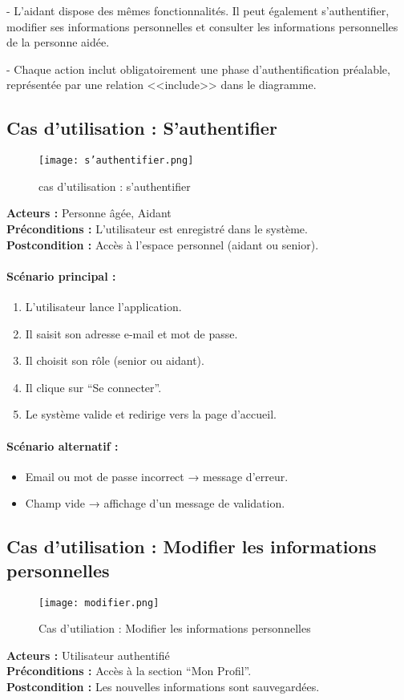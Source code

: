 \documentclass[12pt,a4paper]{report}
\begin{document}
-	L’aidant dispose des mêmes fonctionnalités. Il peut également s’authentifier, modifier ses informations personnelles et consulter les informations personnelles de la personne aidée.

-	Chaque action inclut obligatoirement une phase d’authentification préalable, représentée par une relation <<include>> dans le diagramme.

\subsection{Cas d’utilisation : S’authentifier}
\begin{figure}[H] 
    \centering
    \texttt{[image: s'authentifier.png]}
    \caption{cas d'utilisation : s'authentifier}
    \label{fig:s'authentifier}
\end{figure}
\textbf{Acteurs :} Personne âgée, Aidant \\
\textbf{Préconditions :} L’utilisateur est enregistré dans le système. \\
\textbf{Postcondition :} Accès à l’espace personnel (aidant ou senior).

\paragraph{Scénario principal :}
\begin{enumerate}
    \item L’utilisateur lance l’application.
    \item Il saisit son adresse e-mail et mot de passe.
    \item Il choisit son rôle (senior ou aidant).
    \item Il clique sur “Se connecter”.
    \item Le système valide et redirige vers la page d’accueil.
\end{enumerate}

\paragraph{Scénario alternatif :}
\begin{itemize}
    \item Email ou mot de passe incorrect → message d’erreur.
    \item Champ vide → affichage d’un message de validation.
\end{itemize}

\subsection{Cas d’utilisation : Modifier les informations personnelles}
\begin{figure}[H] 
    \centering
    \texttt{[image: modifier.png]}
    \caption{Cas d'utiliation : Modifier les informations personnelles }
    \label{fig:modifierSprint1}
\end{figure}
\textbf{Acteurs :} Utilisateur authentifié \\
\textbf{Préconditions :} Accès à la section “Mon Profil”. \\
\textbf{Postcondition :} Les nouvelles informations sont sauvegardées.
\end{document}
